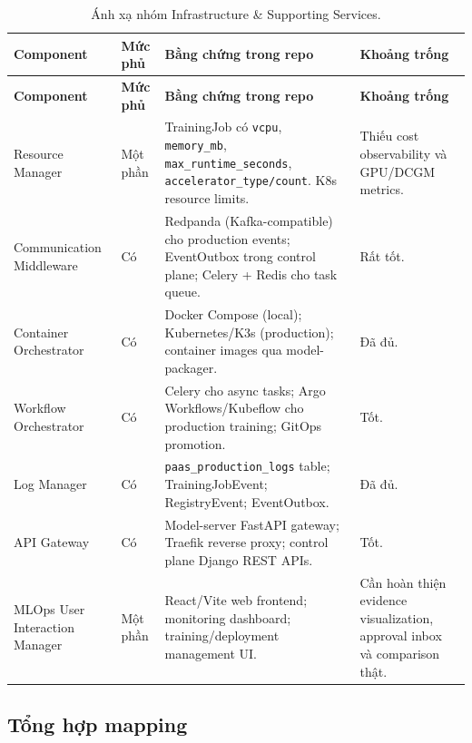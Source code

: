 \documentclass[11pt,a4paper]{article}
\newcommand{\statusyes}{\textcolor{green!45!black}{Có}}
\newcommand{\statuspartial}{\textcolor{orange!75!black}{Một phần}}
\newcommand{\codepath}[1]{\texttt{\small #1}}
\begin{document}
\begin{longtable}{@{}P{2.6cm}P{1.6cm}P{4.7cm}P{4.5cm}@{}}
\caption{Ánh xạ nhóm Infrastructure \& Supporting Services.}\\
\toprule
\textbf{Component} & \textbf{Mức phủ} & \textbf{Bằng chứng trong repo} & \textbf{Khoảng trống} \\
\midrule
\endfirsthead
\toprule
\textbf{Component} & \textbf{Mức phủ} & \textbf{Bằng chứng trong repo} & \textbf{Khoảng trống} \\
\midrule
\endhead
Resource Manager & \statuspartial & TrainingJob có \codepath{vcpu}, \codepath{memory\_mb}, \codepath{max\_runtime\_seconds}, \codepath{accelerator\_type/count}. K8s resource limits. & Thiếu cost observability và GPU/DCGM metrics. \\
\addlinespace
Communication Middleware & \statusyes & Redpanda (Kafka-compatible) cho production events; EventOutbox trong control plane; Celery + Redis cho task queue. & Rất tốt. \\
\addlinespace
Container Orchestrator & \statusyes & Docker Compose (local); Kubernetes/K3s (production); container images qua model-packager. & Đã đủ. \\
\addlinespace
Workflow Orchestrator & \statusyes & Celery cho async tasks; Argo Workflows/Kubeflow cho production training; GitOps promotion. & Tốt. \\
\addlinespace
Log Manager & \statusyes & \codepath{paas\_production\_logs} table; TrainingJobEvent; RegistryEvent; EventOutbox. & Đã đủ. \\
\addlinespace
API Gateway & \statusyes & Model-server FastAPI gateway; Traefik reverse proxy; control plane Django REST APIs. & Tốt. \\
\addlinespace
MLOps User Interaction Manager & \statuspartial & React/Vite web frontend; monitoring dashboard; training/deployment management UI. & Cần hoàn thiện evidence visualization, approval inbox và comparison thật. \\
\bottomrule
\end{longtable}

\subsection{Tổng hợp mapping}
\end{document}
